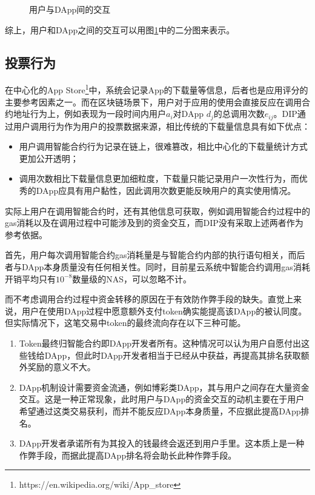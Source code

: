 \begin{figure}
	\centering
  
\caption{用户与DApp间的交互 \label{fig:interact}}
\end{figure}

综上，用户和DApp之间的交互可以用图\ref{fig:interact}中的二分图来表示。

\subsection{投票行为}
\label{subsection:voting}
在中心化的App Store\footnote{https://en.wikipedia.org/wiki/App\_store}中，系统会记录App的下载量等信息，后者也是应用评分的主要参考因素之一。而在区块链场景下，用户对于应用的使用会直接反应在调用合约地址行为上，例如表现为一段时间内用户$a_i$对DApp $d_j$的总调用次数$e_{ij}$。DIP通过用户调用行为作为用户的投票数据来源，相比传统的下载量信息具有如下优点：
\begin{itemize}
	\item 用户调用智能合约行为记录在链上，很难篡改，相比中心化的下载量统计方式更加公开透明；
	\item 调用次数相比下载量信息更加细粒度，下载量只能记录用户一次性行为，而优秀的DApp应具有用户黏性，因此调用次数更能反映用户的真实使用情况。
\end{itemize}

实际上用户在调用智能合约时，还有其他信息可获取，例如调用智能合约过程中的gas消耗以及在调用过程中可能涉及到的资金交互，而DIP没有采取上述两者作为参考依据。

首先，用户每次调用智能合约gas消耗量是与智能合约内部的执行语句相关，而后者与DApp本身质量没有任何相关性。同时，目前星云系统中智能合约调用gas消耗开销平均只有$10^{-8}$数量级的NAS，可以忽略不计。


而不考虑调用合约过程中资金转移的原因在于有效防作弊手段的缺失。直觉上来说，用户在使用DApp过程中愿意额外支付token确实能提高该DApp的被认同度。但实际情况下，这笔交易中token的最终流向存在以下三种可能。
\begin{enumerate}
\item Token最终归智能合约即DApp开发者所有。这种情况可以认为用户自愿付出这些钱给DApp，但此时DApp开发者相当于已经从中获益，再提高其排名获取额外奖励的意义不大。

\item DApp机制设计需要资金流通，例如博彩类DApp，其与用户之间存在大量资金交互。这是一种正常现象，此时用户与DApp的资金交互的动机主要在于用户希望通过这类交易获利，而并不能反应DApp本身质量，不应据此提高DApp排名。

\item DApp开发者承诺所有为其投入的钱最终会返还到用户手里。这本质上是一种作弊手段，而据此提高DApp排名将会助长此种作弊手段。
\end{enumerate}

